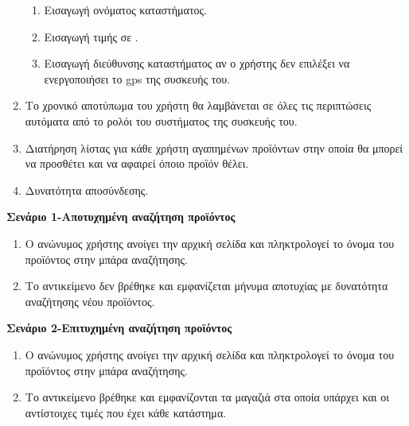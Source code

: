 \documentclass[12pt, oneside, a4paper]{report}
\begin{document}
\begin{enumerate}
\begin{enumerate}
     \item Εισαγωγή ονόματος καταστήματος.
     \item Εισαγωγή τιμής σε \texteuro.
     \item Εισαγωγή διεύθυνσης καταστήματος αν ο χρήστης δεν επιλέξει να ενεργοποιήσει το gps της συσκευής του.     
    \end{enumerate}
\item Το χρονικό αποτύπωμα του χρήστη θα λαμβάνεται σε όλες τις περιπτώσεις αυτόματα από το ρολόι του συστήματος της συσκευής του.
\item Διατήρηση λίστας για κάθε χρήστη αγαπημένων προϊόντων στην οποία θα μπορεί να προσθέτει και να αφαιρεί όποιο προϊόν θέλει.
\item Δυνατότητα αποσύνδεσης.
\end{enumerate}

\vspace{0.5cm}
\textbf{Σενάριο 1-Αποτυχημένη αναζήτηση προϊόντος}\\
\begin{enumerate}
 \item Ο  ανώνυμος χρήστης ανοίγει την αρχική σελίδα και πληκτρολογεί το όνομα του προϊόντος στην μπάρα αναζήτησης.
 \item Το αντικείμενο δεν βρέθηκε και εμφανίζεται μήνυμα αποτυχίας με δυνατότητα αναζήτησης νέου προϊόντος.
\end{enumerate}

\vspace{0.5cm}
\textbf{Σενάριο 2-Επιτυχημένη αναζήτηση προϊόντος}\\
\begin{enumerate}
 \item Ο  ανώνυμος χρήστης ανοίγει την αρχική σελίδα και πληκτρολογεί το όνομα του προϊόντος στην μπάρα αναζήτησης.
 \item Το αντικείμενο βρέθηκε και εμφανίζονται τα μαγαζιά στα οποία υπάρχει και οι αντίστοιχες τιμές που έχει κάθε κατάστημα.
\end{enumerate}
\end{document}
